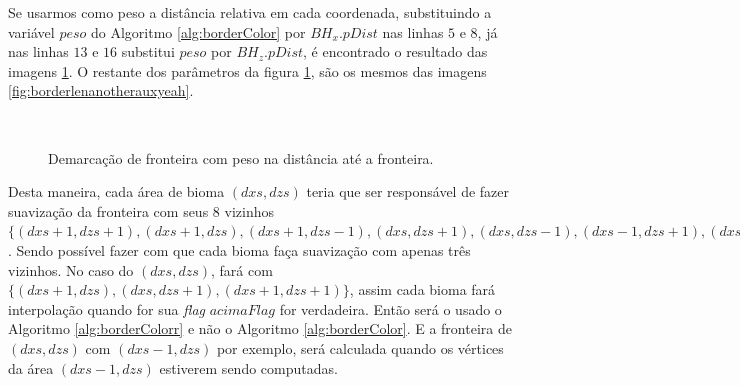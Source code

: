 Se usarmos como peso a distância relativa em cada coordenada, substituindo a variável
$peso$ do Algoritmo \ref{alg:borderColor} por $BH_{x}.pDist$ nas linhas $5$ e $8$, já
nas linhas $13$ e $16$ substitui $peso$ por $BH_{z}.pDist$, é 
encontrado o resultado das imagens \ref{fig:borderlenanotherauxyeahp}. O restante dos parâmetros
da figura \ref{fig:borderlenanotherauxyeahp}, são os mesmos das imagens \ref{fig:borderlenanotherauxyeah}.

\begin{figure}[H]
     \centering
     \hspace{0.1cm}
     \\
     \caption{Demarcação de fronteira com peso na distância até a fronteira.}
     
     \label{fig:borderlenanotherauxyeahp}
\end{figure}

Desta maneira, cada área de bioma $(dxs, dzs)$ teria que ser responsável de fazer suavização da 
fronteira com seus $8$ vizinhos 
$\{(dxs+1, dzs+1), (dxs+1, dzs), (dxs+1, dzs-1), (dxs, dzs+1), (dxs, dzs-1), (dxs-1, dzs+1), (dxs-1, dzs), (dxs-1, dzs-1)\}$.
Sendo possível fazer com que cada bioma faça suavização com apenas três vizinhos. No caso do 
$(dxs, dzs)$, fará com $\{(dxs+1, dzs), (dxs, dzs+1), (dxs+1, dzs+1)\}$, assim cada 
bioma fará interpolação quando for sua \textit{flag} $acimaFlag$ for verdadeira. Então
será o usado o Algoritmo \ref{alg:borderColorr} e não o Algoritmo \ref{alg:borderColor}.
E a fronteira de $(dxs, dzs)$ com $(dxs-1, dzs)$ por exemplo, será calculada quando
os vértices da área $(dxs-1, dzs)$ estiverem sendo computadas.

